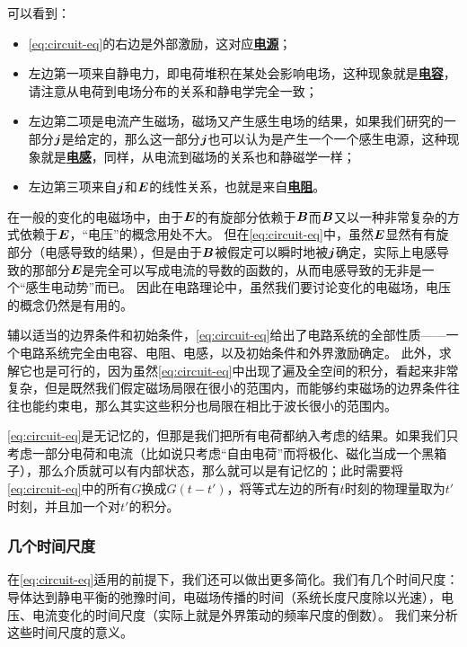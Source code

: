 \documentclass[UTF8, a4paper]{ctexart}
\newcommand*{\concept}[1]{\underline{\textbf{#1}}}
\begin{document}
可以看到：
\begin{itemize}
    \item \eqref{eq:circuit-eq}的右边是外部激励，这对应\concept{电源}；
    \item 左边第一项来自静电力，即电荷堆积在某处会影响电场，这种现象就是\concept{电容}，请注意从电荷到电场分布的关系和静电学完全一致；
    \item 左边第二项是电流产生磁场，磁场又产生感生电场的结果，如果我们研究的一部分$\vb*{j}$是给定的，那么这一部分$\vb*{j}$也可以认为是产生一个一个感生电源，这种现象就是\concept{电感}，同样，从电流到磁场的关系也和静磁学一样；
    \item 左边第三项来自$\vb*{j}$和$\vb*{E}$的线性关系，也就是来自\concept{电阻}。
\end{itemize}

在一般的变化的电磁场中，由于$\vb*{E}$的有旋部分依赖于$\vb*{B}$而$\vb*{B}$又以一种非常复杂的方式依赖于$\vb*{E}$，“电压”的概念用处不大。
但在\eqref{eq:circuit-eq}中，虽然$\vb*{E}$显然有有旋部分（电感导致的结果），但是由于$\vb*{B}$被假定可以瞬时地被$\vb*{j}$确定，实际上电感导致的那部分$\vb*{E}$是完全可以写成电流的导数的函数的，从而电感导致的无非是一个“感生电动势”而已。
因此在电路理论中，虽然我们要讨论变化的电磁场，电压的概念仍然是有用的。


辅以适当的边界条件和初始条件，\eqref{eq:circuit-eq}给出了电路系统的全部性质——一个电路系统完全由电容、电阻、电感，以及初始条件和外界激励确定。
此外，求解它也是可行的，因为虽然\eqref{eq:circuit-eq}中出现了遍及全空间的积分，看起来非常复杂，但是既然我们假定磁场局限在很小的范围内，而能够约束磁场的边界条件往往也能约束电，那么其实这些积分也局限在相比于波长很小的范围内。

\eqref{eq:circuit-eq}是无记忆的，但那是我们把所有电荷都纳入考虑的结果。如果我们只考虑一部分电荷和电流（比如说只考虑“自由电荷”而将极化、磁化当成一个黑箱子），那么介质就可以有内部状态，那么就可以是有记忆的；此时需要将\eqref{eq:circuit-eq}中的所有$G$换成$G(t-t')$，将等式左边的所有$t$时刻的物理量取为$t'$时刻，并且加一个对$t'$的积分。

\subsubsection{几个时间尺度}

在\eqref{eq:circuit-eq}适用的前提下，我们还可以做出更多简化。我们有几个时间尺度：导体达到静电平衡的弛豫时间，电磁场传播的时间（系统长度尺度除以光速），电压、电流变化的时间尺度（实际上就是外界策动的频率尺度的倒数）。
我们来分析这些时间尺度的意义。
\end{document}

